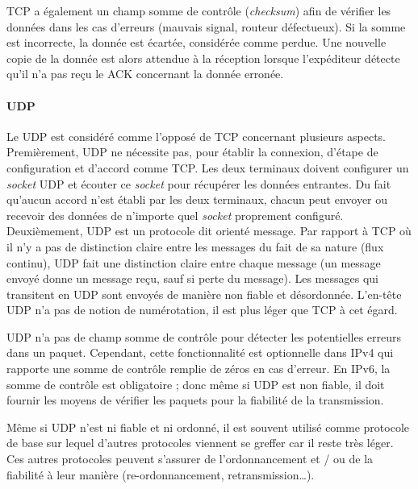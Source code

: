 \gls{TCP} a également un champ \og somme de contrôle\fg{} (\textit{checksum}) afin 
de vérifier les données dans les cas d'erreurs (mauvais signal, routeur 
défectueux). 
Si la somme est incorrecte, la donnée est écartée, considérée comme perdue. 
Une nouvelle copie de la donnée est alors attendue à la réception lorsque 
l'expéditeur détecte qu'il n'a pas reçu le ACK concernant la donnée erronée.

\paragraph{UDP}
Le \gls{UDP} est considéré comme l'opposé de \gls{TCP} concernant plusieurs 
aspects. Premièrement, \gls{UDP} ne nécessite pas, pour établir la connexion, d'étape 
de configuration et d'accord comme \gls{TCP}. Les deux terminaux doivent 
configurer un \textit{socket} \gls{UDP} et écouter ce \textit{socket} pour récupérer 
les données entrantes. 
Du fait qu'aucun accord n'est établi par les deux terminaux, chacun 
peut envoyer ou recevoir des données de n'importe quel \textit{socket} proprement 
configuré.
Deuxièmement, \gls{UDP} est un protocole dit \og orienté message\fg{}. Par 
rapport à \gls{TCP} où il n'y a pas de distinction claire entre les messages du fait 
de sa nature (flux continu), \gls{UDP} fait une distinction claire entre chaque 
message (un message envoyé donne un message reçu, sauf si perte du 
message). Les messages qui transitent en \gls{UDP} sont envoyés de manière 
non fiable et désordonnée. L'en-tête \gls{UDP} n'a pas de notion de numérotation, il 
est plus léger que \gls{TCP} à cet égard.

\gls{UDP} n'a pas de champ somme de contrôle pour détecter les 
potentielles erreurs dans un paquet. Cependant, cette fonctionnalité est optionnelle 
dans IPv4 qui rapporte une somme de contrôle remplie de zéros en cas d'erreur. En 
IPv6, la somme de contrôle est obligatoire ; donc même si \gls{UDP} est non fiable, 
il doit fournir les moyens de vérifier les paquets pour la fiabilité de 
la transmission.

Même si \gls{UDP} n'est ni fiable et ni ordonné, il est souvent utilisé comme 
protocole de base sur lequel d'autres protocoles viennent se greffer car il reste très 
léger. Ces autres protocoles peuvent s'assurer de l'ordonnancement et / ou de la 
fiabilité à leur manière (re-ordonnancement, retransmission\dots). 

